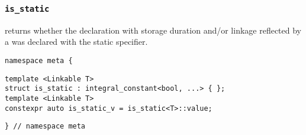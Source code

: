 
\subsubsection{\texttt{is\_static}}

returns whether the declaration with storage duration and/or linkage reflected by a  was declared with the static specifier.

\begin{verbatim}
namespace meta {
\end{verbatim}
\begin{verbatim}
template <Linkable T>
struct is_static : integral_constant<bool, ...> { };
template <Linkable T>
constexpr auto is_static_v = is_static<T>::value;
\end{verbatim}
\begin{verbatim}
} // namespace meta
\end{verbatim}

